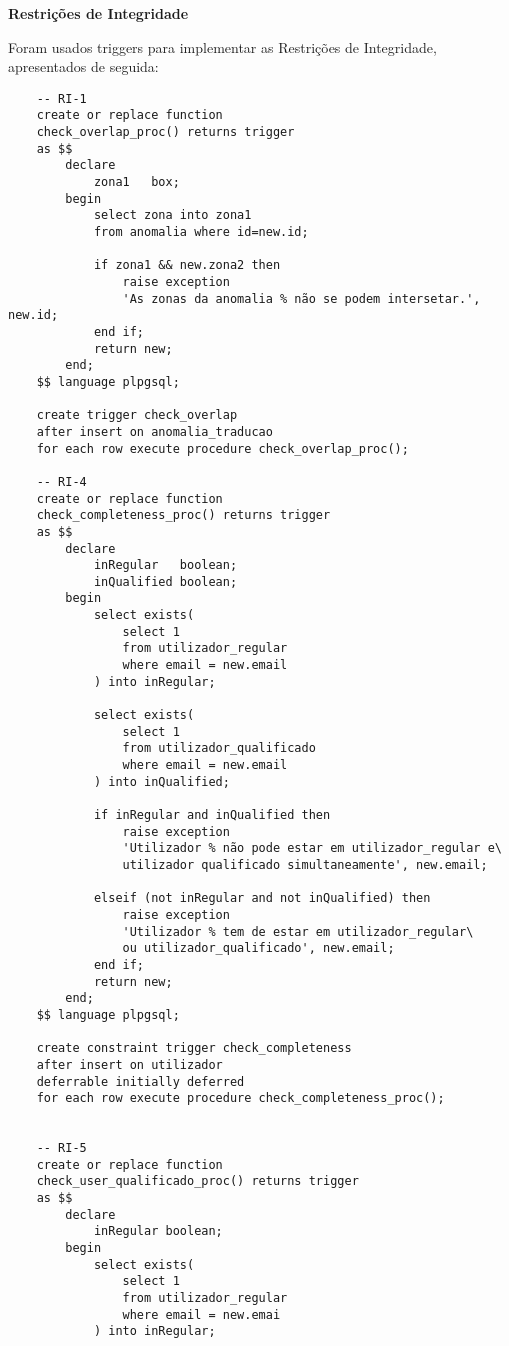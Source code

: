 \documentclass[12pt]{report}
\begin{document}
    \Large
    \textbf{Restrições de Integridade}\\
    \normalsize
    \par Foram usados triggers para implementar as Restrições de Integridade, apresentados de seguida:
    \small
    \begin{verbatim}
    -- RI-1
    create or replace function
    check_overlap_proc() returns trigger
    as $$
        declare
            zona1   box;
        begin
            select zona into zona1
            from anomalia where id=new.id;
            
            if zona1 && new.zona2 then
                raise exception
                'As zonas da anomalia % não se podem intersetar.', new.id;
            end if;
            return new;
        end;
    $$ language plpgsql;
    
    create trigger check_overlap
    after insert on anomalia_traducao 
    for each row execute procedure check_overlap_proc();
    
    -- RI-4
    create or replace function
    check_completeness_proc() returns trigger
    as $$
        declare 
            inRegular   boolean;
            inQualified boolean;
        begin
            select exists(
                select 1
                from utilizador_regular
                where email = new.email
            ) into inRegular;
    
            select exists(
                select 1
                from utilizador_qualificado
                where email = new.email
            ) into inQualified;
        
            if inRegular and inQualified then
                raise exception
                'Utilizador % não pode estar em utilizador_regular e\
                utilizador qualificado simultaneamente', new.email;

            elseif (not inRegular and not inQualified) then
                raise exception
                'Utilizador % tem de estar em utilizador_regular\
                ou utilizador_qualificado', new.email;
            end if;
            return new;
        end;
    $$ language plpgsql;
    
    create constraint trigger check_completeness
    after insert on utilizador
    deferrable initially deferred
    for each row execute procedure check_completeness_proc();
    
    
    -- RI-5
    create or replace function
    check_user_qualificado_proc() returns trigger
    as $$
        declare
            inRegular boolean;
        begin
            select exists(
                select 1
                from utilizador_regular
                where email = new.emai
            ) into inRegular;
    

\end{verbatim}
\end{document}
